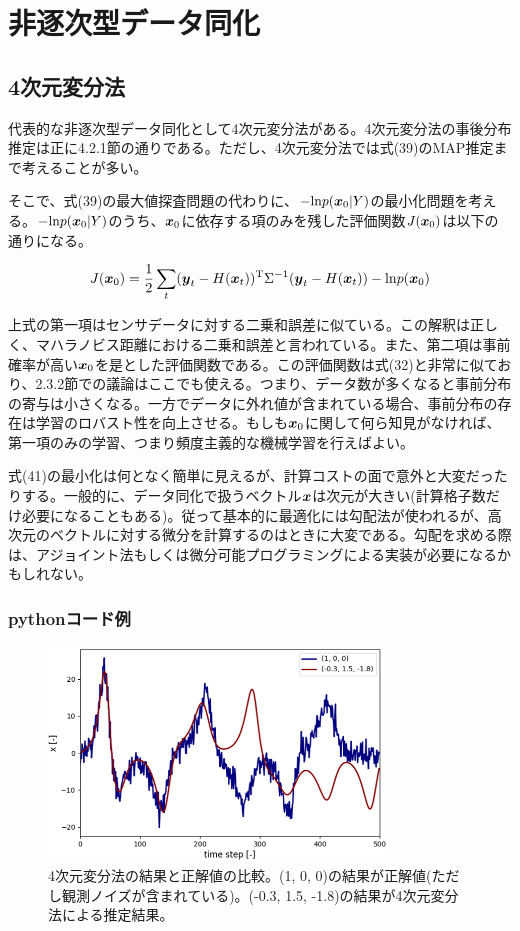 \documentclass[dvipdfmx, 9pt, a4paper]{jsarticle}
\newcommand{\bm}[1]{{\mbox{\boldmath $#1$}}}
\begin{document}
\section{非逐次型データ同化}
\subsection{4次元変分法}
代表的な非逐次型データ同化として4次元変分法がある。4次元変分法の事後分布推定は正に4.2.1節の通りである。ただし、4次元変分法では式(39)のMAP推定まで考えることが多い。\par
そこで、式(39)の最大値探査問題の代わりに、$-{\rm ln}p(\bm x_0|Y)$の最小化問題を考える。$-{\rm ln}p(\bm x_0|Y)$のうち、$\bm x_0$に依存する項のみを残した評価関数$J(\bm x_0)$は以下の通りになる。
\begin{tcolorbox}[title=4次元変分法におけるMAP推定]
\begin{equation}
J(\bm x_0)=\frac{1}{2}\sum_t (\bm y_t-H(\bm x_t))^{\rm T}\Sigma^{-1}(\bm y_t-H(\bm x_t))-{\rm ln}p(\bm x_0)
\end{equation}
\end{tcolorbox}
上式の第一項はセンサデータに対する二乗和誤差に似ている。この解釈は正しく、マハラノビス距離における二乗和誤差と言われている。また、第二項は事前確率が高い$\bm x_0$を是とした評価関数である。この評価関数は式(32)と非常に似ており、2.3.2節での議論はここでも使える。つまり、データ数が多くなると事前分布の寄与は小さくなる。一方でデータに外れ値が含まれている場合、事前分布の存在は学習のロバスト性を向上させる。もしも$\bm x_0$に関して何ら知見がなければ、第一項のみの学習、つまり頻度主義的な機械学習を行えばよい。\par
式(41)の最小化は何となく簡単に見えるが、計算コストの面で意外と大変だったりする。一般的に、データ同化で扱うベクトル$\bm x$は次元が大きい(計算格子数だけ必要になることもある)。従って基本的に最適化には勾配法が使われるが、高次元のベクトルに対する微分を計算するのはときに大変である。勾配を求める際は、アジョイント法もしくは微分可能プログラミングによる実装が必要になるかもしれない。

\subsubsection{pythonコード例}

\begin{figure}[t]
\begin{center}
\includegraphics[width=9cm]{"fig12.png"}
\caption{4次元変分法の結果と正解値の比較。(1, 0, 0)の結果が正解値(ただし観測ノイズが含まれている)。(-0.3, 1.5, -1.8)の結果が4次元変分法による推定結果。}
\end{center}
\end{figure}
\end{document}
